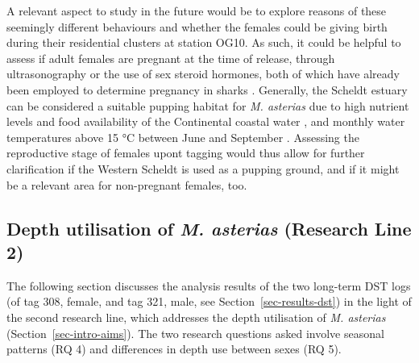 \documentclass[
  authoryear,
  review,
  3p]{elsarticle}
\begin{document}
A relevant aspect to study in the future would be to explore reasons of
these seemingly different behaviours and whether the females could be
giving birth during their residential clusters at station OG10. As such,
it could be helpful to assess if adult females are pregnant at the time
of release, through ultrasonography or the use of sex steroid hormones,
both of which have already been employed to determine pregnancy in
sharks
\citep{awruch_2014, smukall_2019, anderson_2018, fujinami_2020, fujinami_2021}.
Generally, the Scheldt estuary can be considered a suitable pupping
habitat for \emph{M. asterias} due to high nutrient levels and food
availability of the Continental coastal water \citep[which enters the
estuary through tidal currents,][]{wolff_1973}, and monthly water
temperatures above 15 °C between June and September \citep{speed_2010}.
Assessing the reproductive stage of females upont tagging would thus
allow for further clarification if the Western Scheldt is used as a
pupping ground, and if it might be a relevant area for non-pregnant
females, too.

\hypertarget{sec-disc-dst-movementpatterns}{%
\subsection{\texorpdfstring{Depth utilisation of \emph{M. asterias}
(Research Line
2)}{Depth utilisation of M. asterias (Research Line 2)}}\label{sec-disc-dst-movementpatterns}}

The following section discusses the analysis results of the two
long-term DST logs (of tag 308, female, and tag 321, male, see
Section~\ref{sec-results-dst}) in the light of the second research line,
which addresses the depth utilisation of \emph{M. asterias}
(Section~\ref{sec-intro-aims}). The two research questions asked involve
seasonal patterns (RQ 4) and differences in depth use between sexes (RQ
5).
\end{document}
